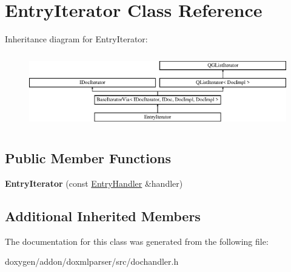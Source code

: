 \hypertarget{class_entry_iterator}{}\section{Entry\+Iterator Class Reference}
\label{class_entry_iterator}
Inheritance diagram for Entry\+Iterator\+:\begin{figure}[H]
\begin{center}
\leavevmode
\includegraphics[height=3.294118cm]{class_entry_iterator}
\end{center}
\end{figure}
\subsection*{Public Member Functions}
\begin{DoxyCompactItemize}
\item 
\mbox{\label{class_entry_iterator_aa84b6c45e1a2a19da969b8ba9f2eb06a}} 
{\bfseries Entry\+Iterator} (const \mbox{\hyperlink{class_entry_handler}{Entry\+Handler}} \&handler)
\end{DoxyCompactItemize}
\subsection*{Additional Inherited Members}


The documentation for this class was generated from the following file\+:\begin{DoxyCompactItemize}
\item 
doxygen/addon/doxmlparser/src/dochandler.\+h\end{DoxyCompactItemize}
